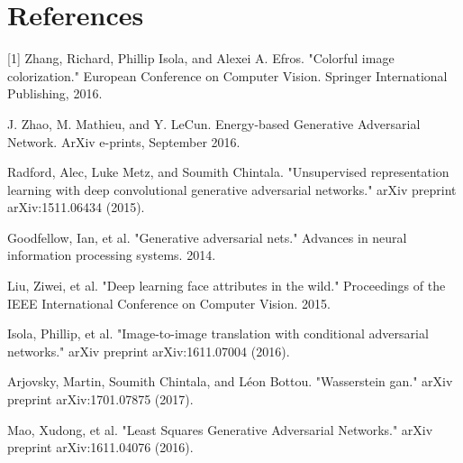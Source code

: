 \documentclass[11pt]{article}
\begin{document}
\section{References}
[1] Zhang, Richard, Phillip Isola, and Alexei A. Efros. "Colorful image colorization." 
European Conference on Computer Vision. Springer International Publishing, 2016.
\vspace{2pt}

\noindent [2] J. Zhao, M. Mathieu, and Y. LeCun.  Energy-based Generative Adversarial 
Network. ArXiv e-prints, September 2016.
\vspace{2pt}

\noindent [3] Radford, Alec, Luke Metz, and Soumith Chintala. "Unsupervised representation learning with deep
convolutional generative adversarial networks." arXiv preprint arXiv:1511.06434 (2015).

\noindent [4] Goodfellow, Ian, et al. "Generative adversarial nets." Advances in neural information processing systems. 2014.

\noindent [5] Liu, Ziwei, et al. "Deep learning face attributes in the wild." Proceedings of the IEEE International Conference on Computer Vision. 2015.

\noindent [6] Isola, Phillip, et al. "Image-to-image translation with conditional adversarial networks." arXiv preprint arXiv:1611.07004 (2016).

\noindent [7] Arjovsky, Martin, Soumith Chintala, and Léon Bottou. "Wasserstein gan." arXiv preprint arXiv:1701.07875 (2017).

\noindent [8] Mao, Xudong, et al. "Least Squares Generative Adversarial Networks." arXiv preprint arXiv:1611.04076 (2016).
\end{document}

